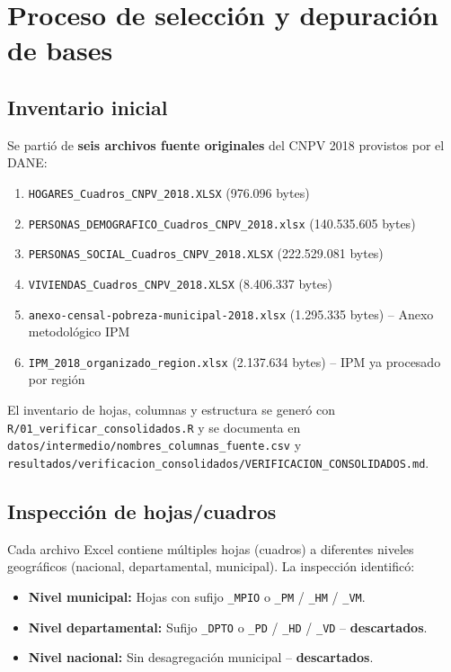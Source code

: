 \section{Proceso de selección y depuración de bases}
\label{ch:seleccion_bases}

\subsection{Inventario inicial}
\label{sec:inventario_inicial}

Se partió de \textbf{seis archivos fuente originales} del CNPV 2018 provistos por el DANE:

\begin{enumerate}
    \item \texttt{HOGARES\_Cuadros\_CNPV\_2018.XLSX} (976.096 bytes)
    \item \texttt{PERSONAS\_DEMOGRAFICO\_Cuadros\_CNPV\_2018.xlsx} (140.535.605 bytes)
    \item \texttt{PERSONAS\_SOCIAL\_Cuadros\_CNPV\_2018.XLSX} (222.529.081 bytes)
    \item \texttt{VIVIENDAS\_Cuadros\_CNPV\_2018.XLSX} (8.406.337 bytes)
    \item \texttt{anexo-censal-pobreza-municipal-2018.xlsx} (1.295.335 bytes) -- Anexo metodológico IPM
    \item \texttt{IPM\_2018\_organizado\_region.xlsx} (2.137.634 bytes) -- IPM ya procesado por región
\end{enumerate}

El inventario de hojas, columnas y estructura se generó con \texttt{R/01\_verificar\_consolidados.R} y se documenta en \texttt{datos/intermedio/nombres\_columnas\_fuente.csv} y \texttt{resultados/verificacion\_consolidados/VERIFICACION\_CONSOLIDADOS.md}.

\subsection{Inspección de hojas/cuadros}
\label{sec:inspeccion_cuadros}

Cada archivo Excel contiene múltiples hojas (cuadros) a diferentes niveles geográficos (nacional, departamental, municipal). La inspección identificó:

\begin{itemize}
    \item \textbf{Nivel municipal:} Hojas con sufijo \texttt{\_MPIO} o \texttt{\_PM} / \texttt{\_HM} / \texttt{\_VM}.
    \item \textbf{Nivel departamental:} Sufijo \texttt{\_DPTO} o \texttt{\_PD} / \texttt{\_HD} / \texttt{\_VD} -- \textbf{descartados}.
    \item \textbf{Nivel nacional:} Sin desagregación municipal -- \textbf{descartados}.
\end{itemize}

